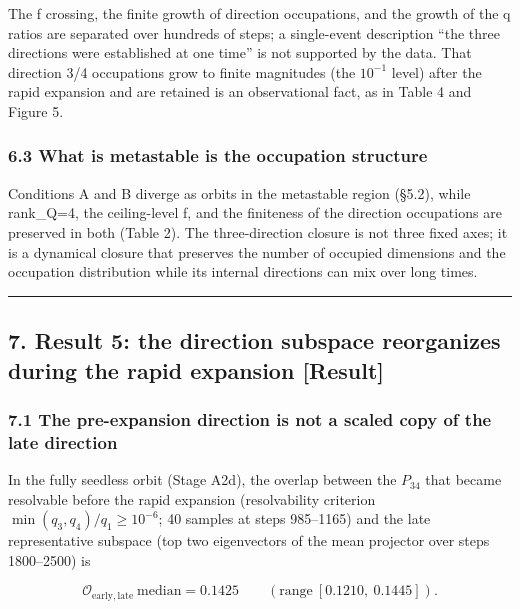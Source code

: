 \documentclass[
  a4paper,
]{article}
\begin{document}
The f crossing, the finite growth of direction occupations, and the
growth of the q ratios are separated over hundreds of steps; a
single-event description ``the three directions were established at one
time'' is not supported by the data. That direction 3/4 occupations grow
to finite magnitudes (the \(10^{-1}\) level) after the rapid expansion
and are retained is an observational fact, as in Table 4 and Figure 5.

\subsubsection{6.3 What is metastable is the occupation
structure}\label{what-is-metastable-is-the-occupation-structure}

Conditions A and B diverge as orbits in the metastable region (§5.2),
while rank\_Q=4, the ceiling-level f, and the finiteness of the
direction occupations are preserved in both (Table 2). The
three-direction closure is not three fixed axes; it is a dynamical
closure that preserves the number of occupied dimensions and the
occupation distribution while its internal directions can mix over long
times.

\begin{center}\rule{0.5\linewidth}{0.5pt}\end{center}

\subsection{7. Result 5: the direction subspace reorganizes during the
rapid expansion
{[}Result{]}}\label{result-5-the-direction-subspace-reorganizes-during-the-rapid-expansion-result}

\subsubsection{7.1 The pre-expansion direction is not a scaled copy of
the late
direction}\label{the-pre-expansion-direction-is-not-a-scaled-copy-of-the-late-direction}

In the fully seedless orbit (Stage A2d), the overlap between the
\(P_{34}\) that became resolvable before the rapid expansion
(resolvability criterion \(\min(q_3,q_4)/q_1\ge10^{-6}\); 40 samples at
steps 985--1165) and the late representative subspace (top two
eigenvectors of the mean projector over steps 1800--2500) is

\[\mathcal O_{\mathrm{early,late}}\ \text{median}=0.1425\qquad(\text{range}\ [0.1210,\ 0.1445]).\]
\end{document}
